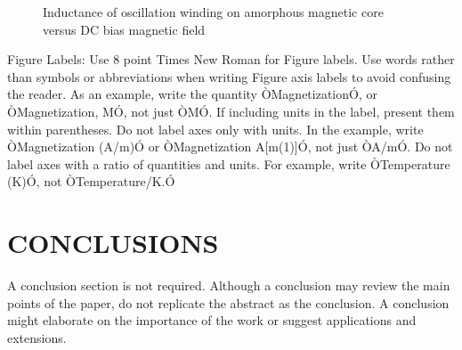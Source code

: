 \documentclass[a4paper, 10pt, conference]{IEEEconf}
\begin{document}
   \begin{figure}[thpb]
      \centering
      \caption{Inductance of oscillation winding on amorphous
       magnetic core versus DC bias magnetic field}
      \label{figurelabel}
   \end{figure}
   

Figure Labels: Use 8 point Times New Roman for Figure labels. Use words rather than symbols or abbreviations when writing Figure axis labels to avoid confusing the reader. As an example, write the quantity ÒMagnetizationÓ, or ÒMagnetization, MÓ, not just ÒMÓ. If including units in the label, present them within parentheses. Do not label axes only with units. In the example, write ÒMagnetization (A/m)Ó or ÒMagnetization {A[m(1)]}Ó, not just ÒA/mÓ. Do not label axes with a ratio of quantities and units. For example, write ÒTemperature (K)Ó, not ÒTemperature/K.Ó

\section{CONCLUSIONS}

A conclusion section is not required. Although a conclusion may review the main points of the paper, do not replicate the abstract as the conclusion. A conclusion might elaborate on the importance of the work or suggest applications and extensions. 

\addtolength{\textheight}{-12cm}   %




\end{document}
